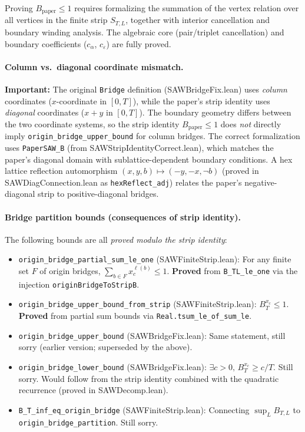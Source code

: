 Proving $B_{\mathrm{paper}} \leq 1$ requires formalizing the summation of
the vertex relation over all vertices in the finite strip $S_{T,L}$,
together with interior cancellation and boundary winding analysis.
The algebraic core (pair/triplet cancellation) and boundary coefficients
($c_\alpha$, $c_\varepsilon$) are fully proved.

\paragraph{Column vs.\ diagonal coordinate mismatch.}
\textbf{Important:} The original \texttt{Bridge} definition (SAWBridgeFix.lean)
uses \emph{column} coordinates ($x$-coordinate in $[0,T]$), while the paper's
strip identity uses \emph{diagonal} coordinates ($x+y$ in $[0,T]$). The
boundary geometry differs between the two coordinate systems, so the strip
identity $B_{\mathrm{paper}} \leq 1$ does \emph{not} directly imply
\texttt{origin\_bridge\_upper\_bound} for column bridges.
The correct formalization uses \texttt{PaperSAW\_B} (from
SAWStripIdentityCorrect.lean), which matches the paper's diagonal domain
with sublattice-dependent boundary conditions.
A hex lattice reflection automorphism $(x,y,b) \mapsto (-y,-x,\lnot b)$
(proved in SAWDiagConnection.lean as \texttt{hexReflect\_adj}) relates
the paper's negative-diagonal strip to positive-diagonal bridges.

\paragraph{Bridge partition bounds (consequences of strip identity).}
The following bounds are all \emph{proved modulo the strip identity}:
\begin{itemize}
  \item \texttt{origin\_bridge\_partial\_sum\_le\_one} (SAWFiniteStrip.lean):
    For any finite set $F$ of origin bridges, $\sum_{b \in F} x_c^{\ell(b)} \leq 1$.
    \textbf{Proved} from \texttt{B\_TL\_le\_one} via the injection
    \texttt{originBridgeToStripB}.
  \item \texttt{origin\_bridge\_upper\_bound\_from\_strip} (SAWFiniteStrip.lean):
    $B_T^{x_c} \leq 1$. \textbf{Proved} from partial sum bounds via
    \texttt{Real.tsum\_le\_of\_sum\_le}.
  \item \texttt{origin\_bridge\_upper\_bound} (SAWBridgeFix.lean):
    Same statement, still sorry (earlier version; superseded by the above).
  \item \texttt{origin\_bridge\_lower\_bound} (SAWBridgeFix.lean):
    $\exists c > 0,\, B_T^{x_c} \geq c/T$. Still sorry. Would follow from the
    strip identity combined with the quadratic recurrence (proved in SAWDecomp.lean).
  \item \texttt{B\_T\_inf\_eq\_origin\_bridge} (SAWFiniteStrip.lean):
    Connecting $\sup_L B_{T,L}$ to \texttt{origin\_bridge\_partition}. Still sorry.
\end{itemize}

